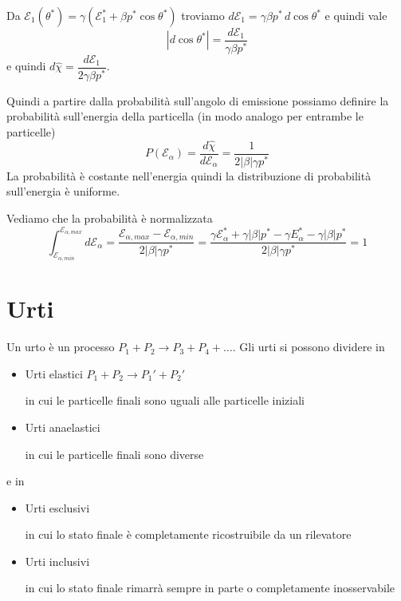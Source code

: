 \documentclass[12pt,a4paper,titlepage, twoside, openright]{book}
\numberwithin{equation}{chapter}
\begin{document}
Da $\mathcal{E}_1(\theta^*)=\gamma(\mathcal{E}_1^*+\beta p^*\cos{\theta^*})$ troviamo $d\mathcal{E}_1=\gamma\beta p^*\, d \cos{\theta^*}$ e quindi vale
\[
\left|d \cos{\theta^*}\right|= \dfrac{d \mathcal{E}_1}{\gamma\beta p^*}
\]
e quindi $d\hat{\chi}=\dfrac{d \mathcal{E}_1}{2\gamma\beta p^*}$.

Quindi a partire dalla probabilità sull'angolo di emissione possiamo definire la probabilità sull'energia della particella (in modo analogo per entrambe le particelle)
\begin{equation}
P(\mathcal{E}_\alpha)=\dfrac{d\hat{\chi}}{d\mathcal{E}_\alpha}=\dfrac{1}{2 |\beta| \gamma p^*}
\end{equation}
La probabilità è costante nell'energia quindi la distribuzione di probabilità sull'energia è uniforme.

Vediamo che la probabilità è normalizzata
\[
\int_{\mathcal{E}_{\alpha,min}}^{\mathcal{E}_{\alpha,max}} d\mathcal{E}_\alpha = \dfrac{\mathcal{E}_{\alpha,max}-\mathcal{E}_{\alpha,min}}{2|\beta|\gamma p^*}=\dfrac{\gamma\mathcal{E}_\alpha^*+\gamma|\beta| p^* - \gamma{E}_\alpha^* -\gamma|\beta| p^* }{2|\beta|\gamma p^*}=1
\]


\chapter{Urti}

Un urto è un processo $P_1 + P_2 \rightarrow P_3 + P_4 + \dots$.
Gli urti si possono dividere in \begin{itemize}
\item Urti elastici $P_1+P_2\rightarrow P_1' + P_2'$ \hspace*{\fill}\begin{minipage}[H]{0.6\linewidth} in cui le particelle finali sono uguali alle particelle iniziali\end{minipage}
\item Urti anaelastici \hspace*{\fill} \begin{minipage}[H]{0.6\linewidth} in cui le particelle finali sono diverse\end{minipage}
\end{itemize}
e in  \begin{itemize}
\item Urti esclusivi  \hspace*{\fill}\begin{minipage}[H]{0.6\linewidth} in cui lo stato finale è completamente ricostruibile da un rilevatore
\end{minipage}
\item Urti inclusivi \hspace*{\fill} \begin{minipage}[H]{0.6\linewidth} in cui lo stato finale rimarrà sempre in parte o completamente inosservabile\end{minipage}
\end{itemize}
\end{document}

